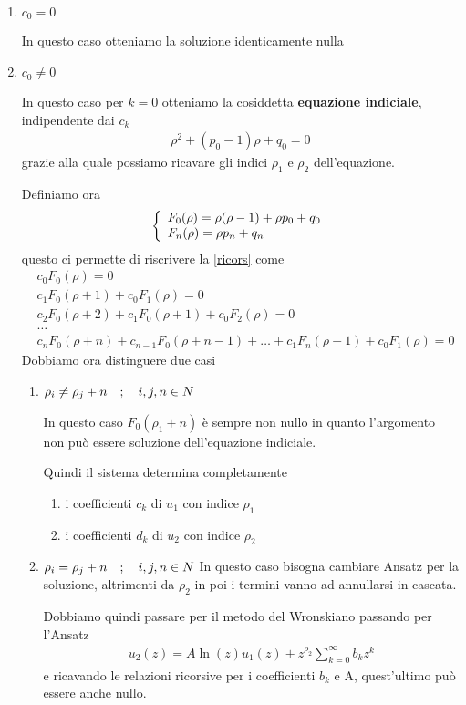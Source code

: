 \begin{enumerate}
	\item $c_0 = 0$
	
	In questo caso otteniamo la soluzione identicamente nulla
	\item $c_0 \neq 0$
	
	In questo caso per $k=0$ otteniamo la cosiddetta \textbf{equazione indiciale}, indipendente dai $c_k$
	\begin{align}
		\rho^2 + (p_0 -1)\rho + q_0 = 0
	\end{align}
	grazie alla quale possiamo ricavare gli indici $\rho_1$ e $\rho_2$ dell'equazione. 
	
	Definiamo ora
	\begin{align}
		\double{F_0(\rho) = \rho(\rho -1) + \rho p_0 + q_0}{F_n(\rho) = \rho p_n + q_n \hfill}
	\end{align}
	questo ci permette di riscrivere la \ref{ricors} come
	\begin{align}
		&c_0 F_0(\rho) = 0\\
		&c_1 F_0(\rho + 1) + c_0 F_1(\rho) = 0\\
		&c_2 F_0(\rho + 2) + c_1 F_0(\rho + 1) + c_0 F_2(\rho) = 0\\
		&\dots \nonumber\\
		&c_n F_0(\rho + n) + c_{n-1} F_0(\rho + n-1) + \dots + c_1 F_n(\rho + 1) + c_0 F_1(\rho) = 0	 	
	\end{align}
 	Dobbiamo ora distinguere due casi
 	\begin{enumerate}
 		\item $\rho_i \neq \rho_j + n \quad ; \quad i,j,n \in N$
 		
 		In questo caso $F_0(\rho_1 + n)$ è sempre non nullo in quanto l'argomento non può essere soluzione dell'equazione indiciale. 
 		
 		Quindi il sistema determina completamente \begin{enumerate}
 			\item i coefficienti $c_k$ di $u_1$ con indice $\rho_1$
 			\item i coefficienti $d_k$ di $u_2$ con indice $\rho_2$
 		\end{enumerate}
 		\newpage
 		\item $\rho_i =    \rho_j + n \quad ; \quad i,j,n \in N$
 		In questo caso bisogna cambiare Ansatz per la soluzione, altrimenti da $\rho_2$ in poi i termini vanno ad annullarsi in cascata.
 		
 		Dobbiamo quindi passare per il metodo del Wronskiano passando per l'Ansatz
 		\begin{align}
 			u_2(z) = A\ln(z)u_1(z) + z^{\rho_2} \sum_{k=0}^{\infty} b_k z^k
 		\end{align}
 		e ricavando le relazioni ricorsive per i coefficienti $b_k$ e A, quest'ultimo può essere anche nullo. 		
 	\end{enumerate}
\end{enumerate}


